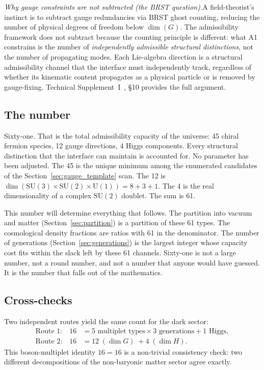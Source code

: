 \documentclass[11pt]{article}
\newcommand{\SU}{\mathrm{SU}}
\newcommand{\U}{\mathrm{U}}
\begin{document}
\smallskip\noindent\textit{Why gauge constraints are not subtracted (the BRST question).}\quad A field-theorist's instinct is to subtract gauge redundancies via BRST ghost counting, reducing the number of physical degrees of freedom below $\dim(G)$.  The admissibility framework does not subtract because the counting principle is different: what A1 constrains is the number of \emph{independently admissible structural distinctions}, not the number of propagating modes.  Each Lie-algebra direction is a structural admissibility channel that the interface must independently track, regardless of whether its kinematic content propagates as a physical particle or is removed by gauge-fixing.  Technical Supplement~I~\cite{BrookeP2Supplement}, \S10 provides the full argument.

\subsection{The number}

Sixty-one.  That is the total admissibility capacity of the universe: 45 chiral fermion species, 12 gauge directions, 4 Higgs components.  Every structural distinction that the interface can maintain is accounted for.  No parameter has been adjusted.  The 45 is the unique minimum among the enumerated candidates of the Section~\ref{sec:gauge_template} scan.  The 12 is $\dim(\SU(3) \times \SU(2) \times \U(1)) = 8 + 3 + 1$.  The 4 is the real dimensionality of a complex $\SU(2)$ doublet.  The sum is 61.

This number will determine everything that follows.  The partition into vacuum and matter (Section~\ref{sec:partition}) is a partition of these 61 types.  The cosmological density fractions are ratios with 61 in the denominator.  The number of generations (Section~\ref{sec:generations}) is the largest integer whose capacity cost fits within the slack left by these 61 channels.  Sixty-one is not a large number, not a round number, and not a number that anyone would have guessed.  It is the number that falls out of the mathematics.

\subsection{Cross-checks}

Two independent routes yield the same count for the dark sector:
\begin{align}
\text{Route 1:} \quad 16 &= 5 \text{ multiplet types} \times 3 \text{ generations} + 1 \text{ Higgs}, \\
\text{Route 2:} \quad 16 &= 12 \;(\dim G) \;+ 4 \;(\dim H).
\end{align}
This boson-multiplet identity $16 = 16$ is a non-trivial consistency check: two different decompositions of the non-baryonic matter sector agree exactly.
\end{document}
